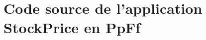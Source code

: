 
\chapter{Code source de l'application StockPrice en PpFf}
\label{sourceCodeStockPricePpFf.ann}



\newpage
